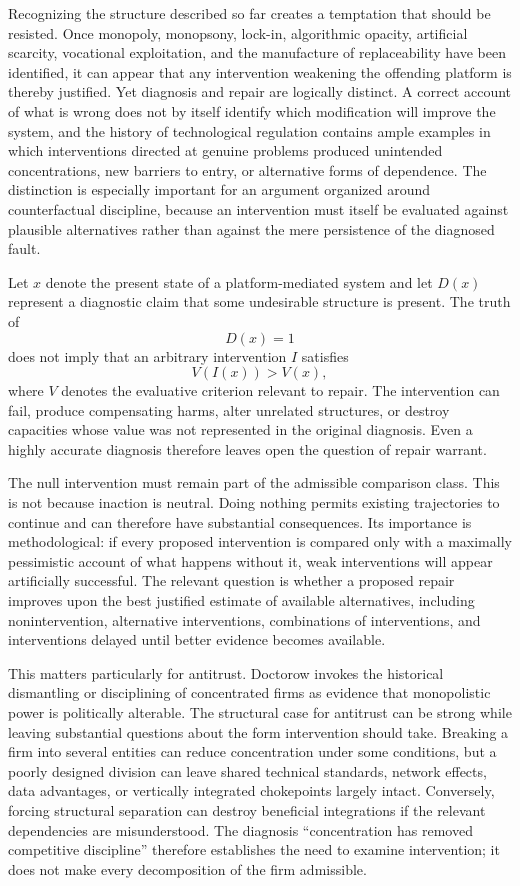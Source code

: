 \documentclass[11pt]{article}
\begin{document}
Recognizing the structure described so far creates a temptation that should be resisted. Once monopoly, monopsony, lock-in, algorithmic opacity, artificial scarcity, vocational exploitation, and the manufacture of replaceability have been identified, it can appear that any intervention weakening the offending platform is thereby justified. Yet diagnosis and repair are logically distinct. A correct account of what is wrong does not by itself identify which modification will improve the system, and the history of technological regulation contains ample examples in which interventions directed at genuine problems produced unintended concentrations, new barriers to entry, or alternative forms of dependence. The distinction is especially important for an argument organized around counterfactual discipline, because an intervention must itself be evaluated against plausible alternatives rather than against the mere persistence of the diagnosed fault.

Let \(x\) denote the present state of a platform-mediated system and let \(D(x)\) represent a diagnostic claim that some undesirable structure is present. The truth of
\[
D(x)=1
\]
does not imply that an arbitrary intervention \(I\) satisfies
\[
V(I(x))>V(x),
\]
where \(V\) denotes the evaluative criterion relevant to repair. The intervention can fail, produce compensating harms, alter unrelated structures, or destroy capacities whose value was not represented in the original diagnosis. Even a highly accurate diagnosis therefore leaves open the question of repair warrant.

The null intervention must remain part of the admissible comparison class. This is not because inaction is neutral. Doing nothing permits existing trajectories to continue and can therefore have substantial consequences. Its importance is methodological: if every proposed intervention is compared only with a maximally pessimistic account of what happens without it, weak interventions will appear artificially successful. The relevant question is whether a proposed repair improves upon the best justified estimate of available alternatives, including nonintervention, alternative interventions, combinations of interventions, and interventions delayed until better evidence becomes available.

This matters particularly for antitrust. Doctorow invokes the historical dismantling or disciplining of concentrated firms as evidence that monopolistic power is politically alterable. The structural case for antitrust can be strong while leaving substantial questions about the form intervention should take. Breaking a firm into several entities can reduce concentration under some conditions, but a poorly designed division can leave shared technical standards, network effects, data advantages, or vertically integrated chokepoints largely intact. Conversely, forcing structural separation can destroy beneficial integrations if the relevant dependencies are misunderstood. The diagnosis ``concentration has removed competitive discipline'' therefore establishes the need to examine intervention; it does not make every decomposition of the firm admissible.
\end{document}
